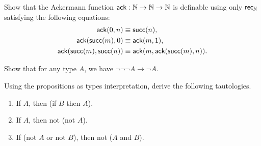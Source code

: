 \begin{ex}\label{ex:ackermann}
  Show that the Ackermann function $\mathsf{ack} : \mathbb{N} \to \mathbb{N} \to \mathbb{N}$ is definable using only $\mathsf{rec}_{\mathbb{N}}$ satisfying the following equations:
  \begin{align*}
    \mathsf{ack}(0,n) &\equiv \mathsf{succ}(n), \\
    \mathsf{ack}(\mathsf{succ}(m),0) &\equiv \mathsf{ack}(m,1), \\
    \mathsf{ack}(\mathsf{succ}(m),\mathsf{succ}(n)) &\equiv \mathsf{ack}(m,\mathsf{ack}(\mathsf{succ}(m),n)).
  \end{align*}
\end{ex}

\begin{solution}[Alan]
  
\end{solution}

\begin{solution}[Steven]
  
\end{solution}

\begin{ex}\label{ex:neg-ldn}
  Show that for any type $A$, we have $\neg\neg\neg A \to \neg A$.
\end{ex}

\begin{solution}[Jake]
  
\end{solution}

\begin{solution}[Daniel]
  
\end{solution}

\begin{solution}[James]
  
\end{solution}

\begin{ex}\label{ex:tautologies}
  Using the propositions as types interpretation, derive the following tautologies.
  \begin{enumerate}
  \item If $A$, then (if $B$ then $A$).
  \item If $A$, then not (not $A$).
  \item If (not $A$ or not $B$), then not ($A$ and $B$).
  \end{enumerate}
\end{ex}

\begin{solution}[Alex]
  
\end{solution}


